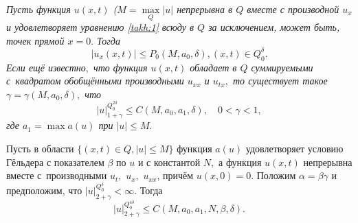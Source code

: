 \smallskip


\begin{theorem}[1]\sl Пусть функция $u(x,t)$ ($M=\max\limits_{Q}|u|$
непрерывна в $Q$  вместе с производной $u_x$ и удовлетворяет
уравнению \eqref{takh:1} всюду в $Q$ за исключением, может быть, точек прямой
$x=0.$ Тогда
\begin{equation}
|u_x(x,t)|\leq P_0(M,a_0,\delta), (x,t)\in Q^{\delta}_{0}.
\label{takh:15}
\end{equation}
Если ещё известно$,$ что функция $u(x,t)$ обладает в  $Q$ суммируемыми с~квадратом обобщёнными производными $u_{xx}$ и
$u_{tx},$ то существует такое $\gamma =\gamma(M,a_0,\delta),$ что
\begin{equation}
|u|^{Q^{2\delta}_{0}}_{1+\gamma}\leq C(M,a_0,a_1,\delta),\quad  
0<\gamma<1,
\label{takh:16}
\end{equation}
где $a_1=\max a(u)$ при $|u|\leq M.$

Пусть в области $\{(x,t)\in Q, |u|\leq M \}$ функция $a(u)$ удовлетворяет условию Гёльдера с показателем $\beta$ по $u$ и с константой $N,$ а функция $u(x,t)$ непрерывна вместе с~производными $u_t,$ $u_x,$ $u_{xx}$, причём $u(x, 0)=0.$ 
Положим $\alpha=\beta\gamma$ и предположим{\rm ,} что $|u|^{Q^{\delta}_{0}}_{2+\gamma}<\infty .$
Тогда \begin{equation}
|u|^{Q^{4\delta}_{0}}_{2+\gamma}\leq C(M,a_0,a_1,N,\beta,\delta).
\label{takh:17}
\end{equation}
\end{theorem}

\smallskip


